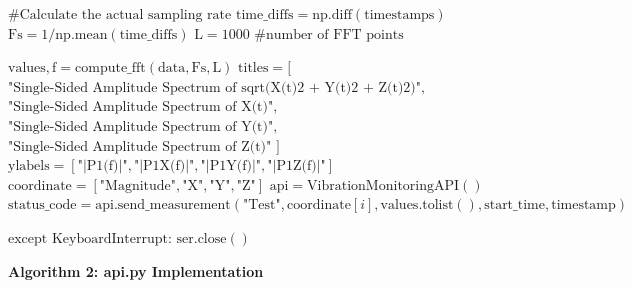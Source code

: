 \begin{algorithmic}[1]
	\STATE $\text{\# Calculate the actual sampling rate}$
	\STATE $\text{time\_diffs} = \text{np.diff}(\text{timestamps})$
	\STATE $\text{Fs} = 1 / \text{np.mean}(\text{time\_diffs})$
	\STATE $\text{L} = 1000$ $\text{\# number of FFT points}$
	
	\STATE $\text{values}, \text{f} = \text{compute\_fft}(\text{data}, \text{Fs}, \text{L})$
	\STATE $\text{titles} = [$
	\STATE \hspace{0.5cm} $\text{"Single-Sided Amplitude Spectrum of sqrt(X(t)\^{}2 + Y(t)\^{}2 + Z(t)\^{}2)"},$
	\STATE \hspace{0.5cm} $\text{"Single-Sided Amplitude Spectrum of X(t)"},$
	\STATE \hspace{0.5cm} $\text{"Single-Sided Amplitude Spectrum of Y(t)"},$
	\STATE \hspace{0.5cm} $\text{"Single-Sided Amplitude Spectrum of Z(t)"}$
	\STATE $]$
	\STATE $\text{ylabels} = [\text{"|P1(f)|"}, \text{"|P1X(f)|"}, \text{"|P1Y(f)|"}, \text{"|P1Z(f)|"}]$
	\STATE $\text{coordinate} = [\text{"Magnitude"}, \text{"X"}, \text{"Y"}, \text{"Z"}]$
	\STATE $\text{api} = \text{VibrationMonitoringAPI}()$
	\STATE $\text{status\_code} = \text{api.send\_measurement}(\text{"Test"}, \text{coordinate}[i], \text{values.tolist}(), \text{start\_time}, \text{timestamp})$
	\ENDFOR
	
	\STATE $\text{except KeyboardInterrupt:}$
	\STATE \hspace{0.5cm} $\text{ser.close}()$
\end{algorithmic}

\clearpage


\noindent\textbf{Algorithm 2: api.py Implementation}

